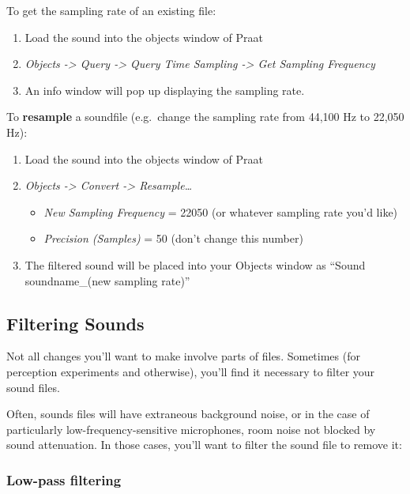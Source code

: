 \documentclass[11pt]{article}
\def\tightlist{}
\begin{document}
To get the sampling rate of an existing file:

\begin{enumerate}
\def\labelenumi{\arabic{enumi}.}
\tightlist
\item
  Load the sound into the objects window of Praat
\item
  \emph{Objects -\textgreater{} Query -\textgreater{} Query Time
  Sampling -\textgreater{} Get Sampling Frequency}
\item
  An info window will pop up displaying the sampling rate.
\end{enumerate}

To \textbf{resample} a soundfile (e.g.~change the sampling rate from
44,100 Hz to 22,050 Hz):

\begin{enumerate}
\def\labelenumi{\arabic{enumi}.}
\tightlist
\item
  Load the sound into the objects window of Praat
\item
  \emph{Objects -\textgreater{} Convert -\textgreater{}
  Resample\ldots{}}

  \begin{itemize}
  \tightlist
  \item
    \emph{New Sampling Frequency} = 22050 (or whatever sampling rate
    you'd like)
  \item
    \emph{Precision (Samples)} = 50 (don't change this number)
  \end{itemize}
\item
  The filtered sound will be placed into your Objects window as ``Sound
  soundname\_(new sampling rate)''
\end{enumerate}

\hypertarget{filtering-sounds}{%
\subsection{Filtering Sounds}\label{filtering-sounds}}

Not all changes you'll want to make involve parts of files. Sometimes
(for perception experiments and otherwise), you'll find it necessary to
filter your sound files.

Often, sounds files will have extraneous background noise, or in the
case of particularly low-frequency-sensitive microphones, room noise not
blocked by sound attenuation. In those cases, you'll want to filter the
sound file to remove it:

\hypertarget{low-pass-filtering}{%
\subsubsection{Low-pass filtering}\label{low-pass-filtering}}
\end{document}
